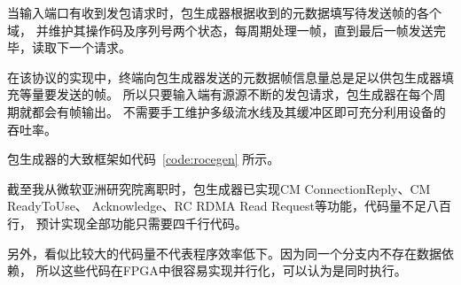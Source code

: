 当输入端口有收到发包请求时，包生成器根据收到的元数据填写待发送帧的各个域，
并维护其操作码及序列号两个状态，每周期处理一帧，直到最后一帧发送完毕，读取下一个请求。

在该协议的实现中，终端向包生成器发送的元数据帧信息量总是足以供包生成器填充等量要发送的帧。
所以只要输入端有源源不断的发包请求，包生成器在每个周期就都会有帧输出。
不需要手工维护多级流水线及其缓冲区即可充分利用设备的吞吐率。

包生成器的大致框架如代码~\ref{code:rocegen} 所示。


截至我从微软亚洲研究院离职时，包生成器已实现CM ConnectionReply、CM ReadyToUse、
Acknowledge、RC RDMA Read Request等功能，代码量不足八百行，
预计实现全部功能只需要四千行代码。

另外，看似比较大的代码量不代表程序效率低下。因为同一个分支内不存在数据依赖，
所以这些代码在FPGA中很容易实现并行化，可以认为是同时执行。
